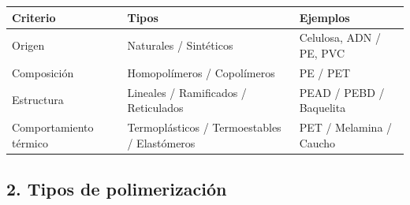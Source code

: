 \begin{center}

\renewcommand{\arraystretch}{1.35}

\begin{tabular}{lll}

\toprule

\textbf{Criterio}

&

\textbf{Tipos}

&

\textbf{Ejemplos}

\\

\midrule

Origen

&

Naturales / Sintéticos

&

Celulosa, ADN / PE, PVC

\\

Composición

&

Homopolímeros / Copolímeros

&

PE / PET

\\

Estructura

&

Lineales / Ramificados / Reticulados

&

PEAD / PEBD / Baquelita

\\

Comportamiento térmico

&

Termoplásticos / Termoestables / Elastómeros

&

PET / Melamina / Caucho

\\

\bottomrule

\end{tabular}

\end{center}


\subsection*{2. Tipos de polimerización}


